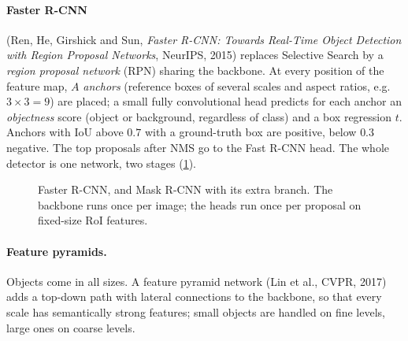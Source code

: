 \begin{notechapter}
\paragraph{Faster R-CNN} (Ren, He, Girshick and Sun, \emph{Faster R-CNN: Towards Real-Time
Object Detection with Region Proposal Networks}, NeurIPS, 2015) replaces Selective
Search by a \emph{region proposal network} (RPN) sharing the backbone. At every position of the
feature map, $A$ \emph{anchors} (reference boxes of several scales and aspect ratios, e.g.\ $3\times3 = 9$) are
placed; a small fully convolutional head predicts for each anchor an \emph{objectness} score (object
or background, regardless of class) and a box regression $t$. Anchors with IoU above $0.7$ with a
ground-truth box are positive, below $0.3$ negative. The top proposals after NMS go to the
Fast R-CNN head. The whole detector is one network, two stages
(\cref{detection-segmentation:fig:faster}).

\begin{figure}[ht]
\centering
{}
\caption{Faster R-CNN, and Mask R-CNN with its extra branch. The backbone runs once per
image; the heads run once per proposal on fixed-size RoI features.}
\label{detection-segmentation:fig:faster}
\end{figure}

\paragraph{Feature pyramids.} Objects come in all sizes. A feature pyramid network (Lin et
al., CVPR, 2017) adds a top-down path with lateral connections to the backbone, so that
every scale has semantically strong features; small objects are handled on fine levels,
large ones on coarse levels.


\end{notechapter}

